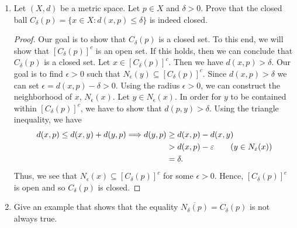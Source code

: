 \documentclass[a4paper]{article}
\begin{document}
\begin{enumerate}
\begin{enumerate}
\begin{proof}
                The last case is similar to (ii). Let \( \epsilon > 0 \). If \( x  \) is a limit point of \( (-\infty, b] \), then \( {N}_{\epsilon}(x) \cap ((- \infty, b]) \setminus  \{ x  \} ) \neq \emptyset \) implies that we can pick \( q \neq x  \) in this intersection such that \( q \in (- \infty ,  b] \). Since \( \epsilon > 0 \) is arbitrary, we have
                \[  q - \epsilon < x < q + \epsilon \leq  b + \epsilon \]
                implies 
                \[  q < x \leq b.  \]
                Hence, \( x \in (-\infty, b] \) and so \( (- \infty , b]  \) is a closed set.
                \end{proof}
        \end{enumerate}
    \item Let \( (X,d) \) be a metric space. Let \( p \in X   \) and \( \delta > 0  \). Prove that the closed ball \( {C}_{\delta}(p) = \{ x \in X : d(x,p) \leq \delta  \}  \) is indeed closed.
    \begin{proof}
        Our goal is to show that \( {C}_{\delta}(p) \) is a closed set. To this end, we will show that \( [{C}_{\delta}(p)]^{c} \) is an open set. If this holds, then we can conclude that \( {C}_{\delta}(p) \) is a closed set. Let \( x \in [{C}_{\delta}(p)]^{c} \). Then we have \( d(x,p) > \delta \). Our goal is to find \( \epsilon > 0  \) such that \( {N}_{\epsilon}(y) \subseteq [{C}_{\delta}(p)]^{c} \). Since \( d(x,p) > \delta \) we can set \( \epsilon = d(x,p) - \delta > 0  \). 
        Using the radius \( \epsilon > 0  \), we can construct the neighborhood of \( x  \), \( {N}_{\epsilon}(x) \). Let \( y \in {N}_{\epsilon}(x) \). In order for \( y  \) to       be contained within \( [{C}_{\delta}(p)]^{c} \), we have to show that \( d(p,y) > \delta \). Using the triangle inequality, we have 
        \begin{align*}
            d(x,p) \leq d(x,y) + d(y,p) \Longrightarrow d(y,p) &\geq d(x,p) - d(x,y) \\   
                                                               &> d(x,p) - \epsilon \tag{\( y \in {N}_{\epsilon}(x) \)} \\ 
                                                               &= \delta.
        \end{align*}
        Thus, we see that \( {N}_{\epsilon}(x) \subseteq [{C}_{\delta}(p)]^{c} \) for some \( \epsilon > 0  \). Hence, \( [{C}_{\delta}(p)]^{c} \) is open and so \( {C}_{\delta}(p) \) is closed.   
    \end{proof}
    \item Give an example that shows that the equality \( \overline{{N}_{\delta}(p)} = {C}_{\delta}(p)  \) is not always true.

\end{enumerate}
\end{document}
